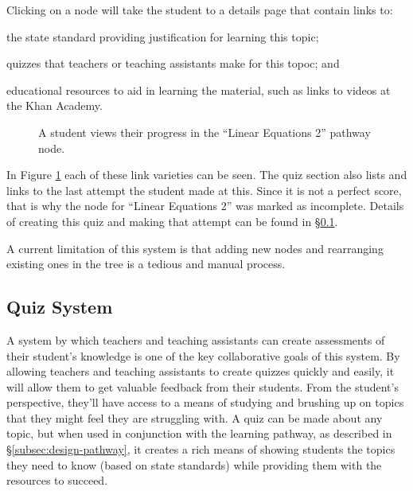 Clicking on a node will take the student to a details page that contain links to:
\begin{inparaenum}[\itshape 1\upshape)]
	\item the state standard providing justification for learning this topic;
	\item quizzes that teachers or teaching assistants make for this topoc; and
	\item educational resources to aid in learning the material, such as links to videos at the Khan Academy.
\end{inparaenum}

\begin{figure}[h!]
	\centering
	\caption{A student views their progress in the ``Linear Equations 2'' pathway node.}
	\label{fig:screens-pathway-node}
\end{figure}

In Figure \ref{fig:screens-pathway-node} each of these link varieties can be seen. The quiz section also lists and links to the last attempt the student made at this. Since it is not a perfect score, that is why the node for ``Linear Equations 2'' was marked as incomplete. Details of creating this quiz and making that attempt can be found in \S \ref{subsec:design-quiz}.

A current limitation of this system is that adding new nodes and rearranging existing ones in the tree is a tedious and manual process.

\subsection{Quiz System}
\label{subsec:design-quiz}
A system by which teachers and teaching assistants can create assessments of their student's knowledge is one of the key collaborative goals of this system. By allowing teachers and teaching assistants to create quizzes quickly and easily, it will allow them to get valuable feedback from their students. From the student's perspective, they'll have access to a means of studying and brushing up on topics that they might feel they are struggling with. A quiz can be made about any topic, but when used in conjunction with the learning pathway, as described in \S \ref{subsec:design-pathway}, it creates a rich means of showing students the topics they need to know (based on state standards) while providing them with the resources to succeed.

